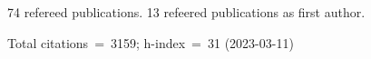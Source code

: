74 refereed publications. 13 refeered publications as first author.

Total citations~=~3159; h-index~=~31 (2023-03-11)